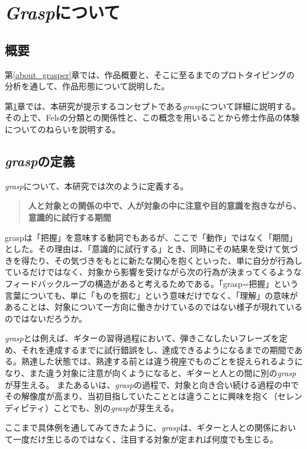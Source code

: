 \chapter{\textit{Grasp}について}
\label{graspについて}

\section{概要}
第\ref{about_grasper}章では、作品概要と、そこに至るまでのプロトタイピングの分析を通して、作品形態について説明した。

第\ref{graspについて}章では、本研究が提示するコンセプトである\textit{grasp}について詳細に説明する。その上で、Felsの分類との関係性と、この概念を用いることから修士作品の体験についてのねらいを説明する。

\section{\textit{grasp}の定義}
\label{grasp_difinition}
\textit{grasp}について、本研究では次のように定義する。

\begin{quote}
  \textbf{人と対象との関係の中で、人が対象の中に注意や目的意識を抱きながら、意識的に試行する期間}
\end{quote}

graspは「把握」を意味する動詞でもあるが、ここで「動作」ではなく「期間」とした。その理由は、「意識的に試行する」とき、同時にその結果を受けて気づきを得たり、その気づきをもとに新たな関心を抱くといった、単に自分が行為しているだけではなく、対象から影響を受けながら次の行為が決まってくるようなフィードバックループの構造があると考えるためである。「grasp=把握」という言葉についても、単に「ものを掴む」という意味だけでなく、「理解」の意味があることは、対象について一方向に働きかけているのではない様子が現れているのではないだろうか。

\textit{grasp}とは例えば、ギターの習得過程において、弾きこなしたいフレーズを定め、それを達成するまでに試行錯誤をし、達成できるようになるまでの期間である。熟達した状態では、熟達する前とは違う視座でものごとを捉えられるようになり、また違う対象に注意が向くようになると、ギターと人との間に別の\textit{grasp}が芽生える。
またあるいは、\textit{grasp}の過程で、対象と向き合い続ける過程の中でその解像度が高まり、当初目指していたこととは違うことに興味を抱く（セレンディピティ）ことでも、別の\textit{grasp}が芽生える。

ここまで具体例を通してみてきたように、\textit{grasp}は、ギターと人との関係において一度だけ生じるのではなく、注目する対象が定まれば何度でも生じる。

